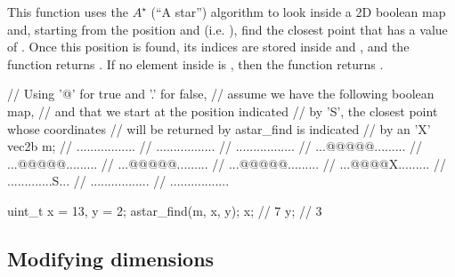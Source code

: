 \documentclass[12pt]{report}
\newenvironment{example}
{
    \begin{mdframed}[style=example,frametitle={Example}]
}
{
    \end{mdframed}
}
\newcommand{\cpptrue}{\cppinline{true}\xspace}
\newcommand{\cppfalse}{\cppinline{false}\xspace}
\begin{document}
\begin{itemize}
This function uses the $A^\star$ (``A star'') algorithm to look inside a 2D boolean map  and, starting from the position  and  (i.e. ), find the closest point that has a value of \cpptrue. Once this position is found, its indices are stored inside  and , and the function returns \cpptrue. If no element inside  is \cpptrue, then the function returns \cppfalse.

\begin{example}
\begin{cppcode}
// Using '@' for true and '.' for false,
// assume we have the following boolean map,
// and that we start at the position indicated
// by 'S', the closest point whose coordinates
// will be returned by astar_find is indicated
// by an 'X'
vec2b m;
// .................
// .................
// .................
// ...@@@@@.........
// ...@@@@@.........
// ...@@@@@.........
// ...@@@@@.........
// ...@@@@X.........
// .............S...
// .................
// .................

uint_t x = 13, y = 2;
astar_find(m, x, y);
x; // 7
y; // 3
\end{cppcode}
\end{example}
\end{itemize}

\subsection{Modifying dimensions}
\end{document}
